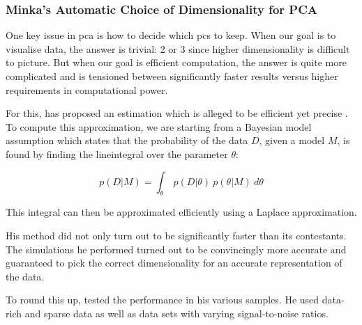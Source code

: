 
\clearpage


\subsubsection{Minka's Automatic Choice of Dimensionality for PCA} \label{sec:mle}

One key issue in \acrlong{pca} is how to decide which \glspl{pc} to keep.
When our goal is to visualise data, the answer is trivial: 2 or 3 since higher dimensionality is difficult to picture.
But when our goal is efficient computation, the answer is quite more complicated and is tensioned between significantly faster results versus higher requirements in computational power.
\bigskip


For this, \citeauthor{minka2000automatic} has proposed an estimation which is alleged to be efficient yet precise \cite{minka2000automatic}.
To compute this approximation, we are starting from a Bayesian model assumption which states that the probability of the data $D$, given a model $M$, is found by finding the \gls{lineintegral} over the parameter $\theta$:

\begin{equation}
	\label{formula:minkaMLE}
	p(D | M) = \int_\theta \ p(D | \theta)\ p(\theta | M)\ d\theta
\end{equation}

\medskip\noindent
This integral can then be approximated efficiently using a Laplace approximation.
\bigskip


His method did not only turn out to be significantly faster than its contestants.
The simulations he performed turned out to be convincingly more accurate and guaranteed to pick the correct dimensionality for an accurate representation of the data.

\bigskip

To round this up, \citeauthor{minka2000automatic} tested the performance in his various samples.
He used data-rich and sparse data as well as data sets with varying signal-to-noise ratios.

